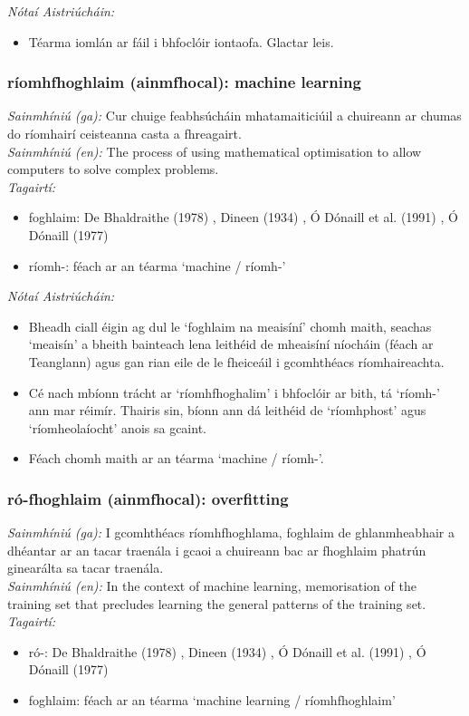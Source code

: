  \noindent \textit{Nótaí Aistriúcháin:}
\begin{itemize}
	\item Téarma iomlán ar fáil i bhfoclóir iontaofa. Glactar leis.
\end{itemize}


\subsubsection*{ríomhfhoghlaim (ainmfhocal): machine learning}
 \noindent \textit{Sainmhíniú (ga):} Cur chuige feabhsúcháin mhatamaiticiúil a chuireann ar chumas do ríomhairí ceisteanna casta a fhreagairt.
\\
 \noindent \textit{Sainmhíniú (en):} The process of using mathematical optimisation to allow computers to solve complex problems.
\\
 \noindent \textit{Tagairtí:}
\begin{itemize}
	\item foghlaim: De Bhaldraithe (1978) \cite{de-bhaldraithe}, Dineen (1934) \cite{dineen}, Ó Dónaill et al. (1991) \cite{focloir-beag}, Ó Dónaill (1977) \cite{odonaill}
	\item ríomh-: féach ar an téarma `machine / ríomh-'
\end{itemize}

 \noindent \textit{Nótaí Aistriúcháin:}
\begin{itemize}
	\item Bheadh ciall éigin ag dul le `foghlaim na meaisíní' chomh maith, seachas `meaisín' a bheith bainteach lena leithéid de mheaisíní níocháin (féach ar Teanglann) agus gan rian eile de le fheiceáil i gcomhthéacs ríomhaireachta.
	\item Cé nach mbíonn trácht ar `ríomhfhoghalim' i bhfoclóir ar bith, tá `ríomh-' ann mar réimír. Thairis sin, bíonn ann dá leithéid de `ríomhphost' agus `ríomheolaíocht' anois sa gcaint.
	\item Féach chomh maith ar an téarma `machine / ríomh-'.
\end{itemize}


\subsubsection*{ró-fhoghlaim (ainmfhocal): overfitting}
 \noindent \textit{Sainmhíniú (ga):} I gcomhthéacs ríomhfhoghlama, foghlaim de ghlanmheabhair a dhéantar ar an tacar traenála i gcaoi a chuireann bac ar fhoghlaim phatrún ginearálta sa tacar traenála.
\\
 \noindent \textit{Sainmhíniú (en):} In the context of machine learning, memorisation of the training set that precludes learning the general patterns of the training set.
\\
 \noindent \textit{Tagairtí:}
\begin{itemize}
	\item ró-: De Bhaldraithe (1978) \cite{de-bhaldraithe}, Dineen (1934) \cite{dineen}, Ó Dónaill et al. (1991) \cite{focloir-beag}, Ó Dónaill (1977) \cite{odonaill}
	\item foghlaim: féach ar an téarma `machine learning / ríomhfhoghlaim'
\end{itemize}

